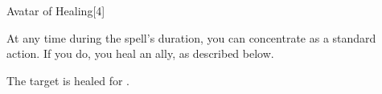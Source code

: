 \begin{spellsection}{Avatar of Healing}[4]
    \begin{spellheader}
    \end{spellheader}
    \begin{spellcontent}
        \begin{spelltargetinginfo}
        \end{spelltargetinginfo}
        \begin{spelleffects}
            \spelleffect At any time during the spell's duration, you can concentrate as a standard action. If you do, you heal an ally, as described below.
            \spelldur \durlong
        \end{spelleffects}
    \end{spellcontent}
    \begin{spellsubcontent}
        \begin{spelltargetinginfo}
        \end{spelltargetinginfo}
        \begin{spelleffects}
            \spelleffect The target is healed for \spelldamage{}.
        \end{spelleffects}
    \end{spellsubcontent}
    \begin{spellfooter}
        \miscastexplode
    \end{spellfooter}
    \begin{spellaugments}
    \end{spellaugments}
\end{spellsection}


